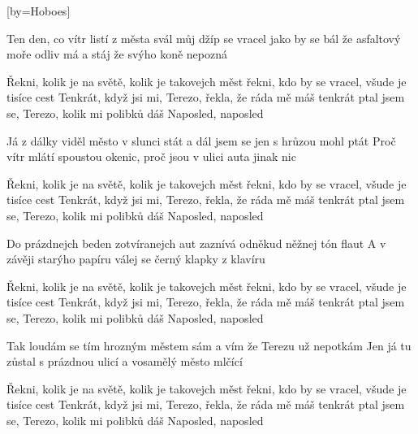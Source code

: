 [by={Hoboes}]

\beginverse{}
Ten den, co vítr listí z města svál
můj džíp se vracel jako by se bál
že asfaltový moře odliv má a stáj že svýho koně nepozná
\endverse{}

\beginchorus{}
Řekni, kolik je na světě, kolik je takovejch měst
řekni, kdo by se vracel, všude je tisíce cest
Tenkrát, když jsi mi, Terezo, řekla, že ráda mě máš
tenkrát ptal jsem se, Terezo, kolik mi polibků dáš
Naposled, naposled
\endchorus{}

\beginverse{}
Já z dálky viděl město v slunci stát
a dál jsem se jen s hrůzou mohl ptát
Proč vítr mlátí spoustou okenic, proč jsou v ulici auta jinak nic
\endverse{}

\repeatingchorus{}
\beginchorus{}
Řekni, kolik je na světě, kolik je takovejch měst
řekni, kdo by se vracel, všude je tisíce cest
Tenkrát, když jsi mi, Terezo, řekla, že ráda mě máš
tenkrát ptal jsem se, Terezo, kolik mi polibků dáš
Naposled, naposled
\endchorus{}

\beginverse{}
Do prázdnejch beden zotvíranejch aut
zaznívá odněkud něžnej tón flaut
A v závěji starýho papíru válej se černý klapky z klavíru
\endverse{}

\repeatingchorus{}
\beginchorus{}
Řekni, kolik je na světě, kolik je takovejch měst
řekni, kdo by se vracel, všude je tisíce cest
Tenkrát, když jsi mi, Terezo, řekla, že ráda mě máš
tenkrát ptal jsem se, Terezo, kolik mi polibků dáš
Naposled, naposled
\endchorus{}

\beginverse{}
Tak loudám se tím hrozným městem sám
a vím že Terezu už nepotkám
Jen já tu zůstal s prázdnou ulicí a vosamělý město mlčící
\endverse{}

\repeatingchorus{}
\beginchorus{}
Řekni, kolik je na světě, kolik je takovejch měst
řekni, kdo by se vracel, všude je tisíce cest
Tenkrát, když jsi mi, Terezo, řekla, že ráda mě máš
tenkrát ptal jsem se, Terezo, kolik mi polibků dáš
Naposled, naposled
\endchorus{}

\endsong{}
